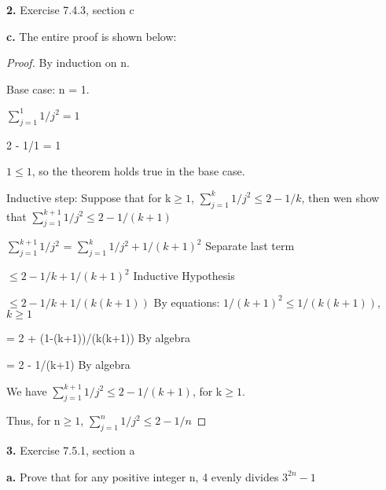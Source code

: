 \documentclass[11pt]{article}
\begin{document}
	\vspace{20mm}
	\textbf{2. }Exercise 7.4.3, section c
	
	\textbf{c.}
	The entire proof is shown below:
	\begin{proof}
	By induction on n.
	
	Base case: n = 1.
	
	$\sum_{j=1}^1 1/j^2 = 1$
	
	2 - 1/1 = 1
	
	$1\leq 1$, so the theorem holds true in the base case.
	
	Inductive step: Suppose that for k$\geq 1$, $\sum_{j=1}^k 1/j^2 \leq 2-1/k$, then wen show that $\sum_{j=1}^{k+1} 1/j^2 \leq 2-1/(k+1)$
	
	$\sum_{j=1}^{k+1} 1/j^2$ = $\sum_{j=1}^k 1/j^2 + 1/(k+1)^2$ \hspace{2mm} Separate last term
	
\hspace{18mm}	$\leq 2-1/k+1/(k+1)^2$\hspace{8mm} Inductive Hypothesis
	
\hspace{18mm}	$\leq 2-1/k+1/(k(k+1))$ \hspace{3mm} By equations: $1/(k+1)^2\leq 1/(k(k+1))$, $k\geq 1$
	
\hspace{18mm}	= 2 + (1-(k+1))/(k(k+1))\hspace{2.5mm} By algebra
	
\hspace{18mm}	= 2 - 1/(k+1)\hspace{24mm} By algebra
	
	We have $\sum_{j=1}^{k+1} 1/j^2 \leq 2-1/(k+1)$, for k$\geq 1$.
	
	Thus, for n$\geq 1$, $\sum_{j=1}^n 1/j^2 \leq 2-1/n$
	
	\end{proof}
	
	
	
	\vspace{20mm}
	\textbf{3.} Exercise 7.5.1, section a
	
	\textbf{a.}
	Prove that for any positive integer n, 4 evenly divides $3^{2n}-1$
	
\end{document}
